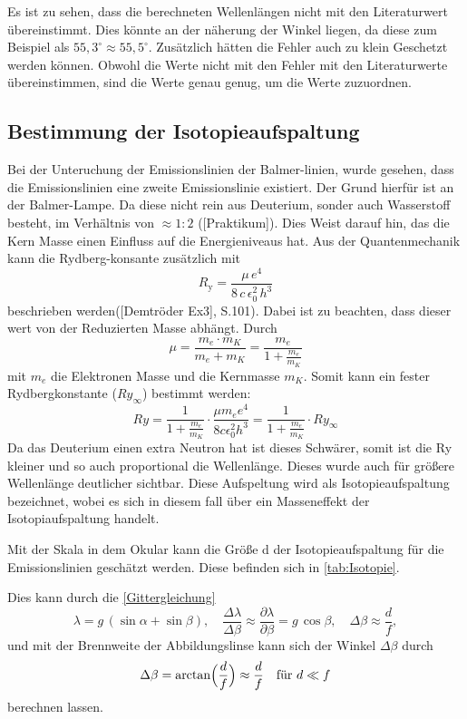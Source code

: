 Es ist zu sehen, dass die berechneten Wellenlängen nicht mit den Literaturwert übereinstimmt. 
Dies könnte an der näherung der Winkel liegen, da diese zum Beispiel als $55,3^\circ \approx 55,5^\circ$.
Zusätzlich hätten die Fehler auch zu klein Geschetzt werden können.
Obwohl die Werte nicht mit den Fehler mit den Literaturwerte übereinstimmen, sind die Werte genau genug, um die Werte zuzuordnen. 


\subsection{Bestimmung der Isotopieaufspaltung}

Bei der Unteruchung der Emissionslinien der Balmer-linien, wurde gesehen, dass die Emissionslinien eine zweite Emissionslinie existiert.
Der Grund hierfür ist an der Balmer-Lampe. 
Da diese nicht rein aus Deuterium, sonder auch Wasserstoff besteht, im Verhältnis von $\approx 1 : 2$ ([Praktikum]). 
Dies Weist darauf hin, das die Kern Masse einen Einfluss auf die Energieniveaus hat. 
Aus der Quantenmechanik kann die Rydberg-konsante zusätzlich mit 
\begin{equation}
  R_{\mathrm{y}} = \frac{\mu\,e^4}{8\,c\,\epsilon_0^2\,h^3}
\end{equation}
beschrieben werden([Demtröder Ex3], S.101). Dabei ist zu beachten, dass dieser wert von der Reduzierten Masse abhängt.
Durch 
\begin{equation}
    \mu = \frac{m_e \cdot m_K}{m_e + m_K} = \frac{m_e}{1+\frac{m_e}{m_K}}
\end{equation}
mit $m_e$ die Elektronen Masse und die Kernmasse $m_K$.
Somit kann ein fester Rydbergkonstante ($Ry_\infty$) bestimmt werden: 
\begin{equation}
    Ry = \frac{1}{1+\frac{m_e}{m_K}}\cdot \frac{\mu m_e e^4}{8c \epsilon_0^2h^3} = \frac{1}{1 + \frac{m_e}{m_K}}\cdot Ry_\infty
\end{equation}
Da das Deuterium einen extra Neutron hat ist dieses Schwärer, somit ist die Ry kleiner und so auch proportional die Wellenlänge. 
Dieses wurde auch für größere Wellenlänge deutlicher sichtbar.
Diese Aufspeltung wird als Isotopieaufspaltung bezeichnet, wobei es sich in diesem fall über ein Masseneffekt der Isotopiaufspaltung handelt.

Mit der Skala in dem Okular kann die Größe d der Isotopieaufspaltung für die Emissionslinien geschätzt werden. 
Diese befinden sich in \cref{tab:Isotopie}.

Dies kann durch die \cref{Gittergleichung}
\begin{equation}
  \lambda = g\,(\sin\alpha + \sin\beta),
  \quad
\frac{\Delta\lambda}{\Delta\beta} \approx 
  \frac{\partial\lambda}{\partial\beta} = g\,\cos\beta,
  \quad
  \Delta\beta \approx \frac{d}{f},
\end{equation}
und mit der Brennweite der Abbildungslinse kann sich der Winkel $\Delta\beta$ durch 
\begin{equation}
    \Delta\beta = \arctan\Bigl(\frac{d}{f}\Bigr) \approx \frac{d}{f} \quad \text{für } d \ll f
\end{equation}
berechnen lassen.

